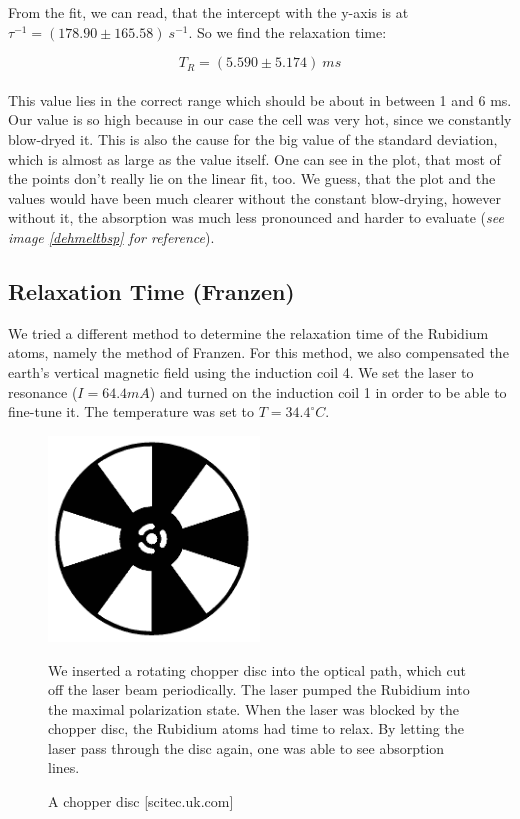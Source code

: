 From the fit, we can read, that the intercept with the y-axis is at $\tau^{-1} = (178.90 \pm 165.58)\ s^{-1}$. So we find the relaxation time:

$$\boxed{T_R = (5.590 \pm 5.174)\ ms}$$ \\

This value lies in the correct range which should be about in between 1 and 6 ms. Our value is so high because in our case the cell was very hot, since we constantly blow-dryed it. This is also the cause for the big value of the standard deviation, which is almost as large as the value itself. One can see in the plot, that most of the points don't really lie on the linear fit, too. We guess, that the plot and the values would have been much clearer without the constant blow-drying, however without it, the absorption was much less pronounced and harder to evaluate (\emph{see image \ref{dehmeltbsp} for reference}).

\subsection{Relaxation Time (Franzen)}

We tried a different method to determine the relaxation time of the Rubidium atoms, namely the method of Franzen. For this method, we also compensated the earth's vertical magnetic field using the induction coil 4. We set the laser to resonance ($I=64.4 mA$) and turned on the induction coil 1 in order to be able to fine-tune it. The temperature was set to $T=34.4^\circ C$.\\

\begin{figure}[H]
\begin{minipage}{0.5\textwidth}
\centering \includegraphics[width=0.5\textwidth]{BilderAusw/chopper.png}
\caption{A chopper disc [scitec.uk.com]}
\end{minipage}
\begin{minipage}{0.5\textwidth}
We inserted a rotating chopper disc into the optical path, which cut off the laser beam periodically. The laser pumped the Rubidium into the maximal polarization state. When the laser was blocked by the chopper disc, the Rubidium atoms had time to relax. By letting the laser pass through the disc again, one was able to see absorption lines.\\

\end{minipage}
\end{figure}

